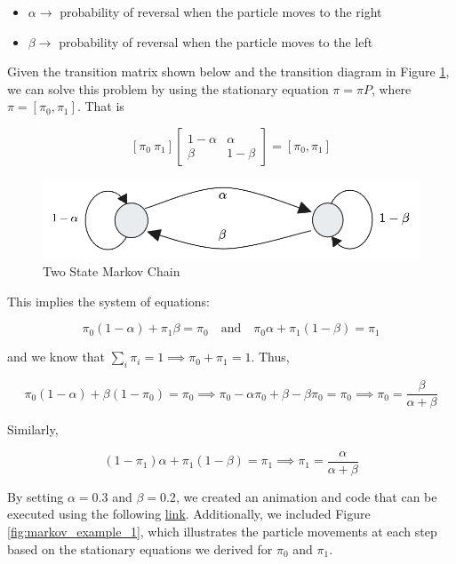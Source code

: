 \documentclass[a4paper,10pt]{article}
\begin{document}
\begin{itemize}
    \item $\alpha \rightarrow$ probability of reversal when the particle moves to the right 
    \item $\beta \rightarrow$ probability of reversal when the particle moves to the left 
\end{itemize}

Given the transition matrix shown below and the transition diagram in Figure \ref{fig:two_state_markov}, we can solve this problem by using the stationary equation $\pi = \pi P$, where $\pi = [\pi_0, \pi_1]$. That is

$$
[\pi_0 \ \pi_1] \begin{bmatrix}
1 - \alpha & \alpha \\
\beta & 1 - \beta 
\end{bmatrix} = [\pi_0, \pi_1]
$$

\begin{figure}[ht]
\centering
\includegraphics[width=0.6\linewidth]{Figures/two_state_markov.png}
\caption{Two State Markov Chain}
\label{fig:two_state_markov}
\end{figure}

This implies the system of equations:

$$
\pi_0(1 - \alpha) + \pi_1 \beta = \pi_0 \quad \text{and} \quad \pi_0 \alpha + \pi_1(1 - \beta) = \pi_1
$$

and we know that $\sum_i \pi_i = 1 \implies \pi_0 + \pi_1 = 1$. Thus,

$$
\pi_0(1 - \alpha) + \beta(1 - \pi_0) = \pi_0 \implies \pi_0 - \alpha \pi_0 + \beta - \beta \pi_0 = \pi_0 \implies \pi_0 = \frac{\beta}{\alpha + \beta}
$$

Similarly,

$$
(1 - \pi_1)\alpha + \pi_1(1 - \beta) = \pi_1 \implies \pi_1 = \frac{\alpha}{\alpha + \beta}
$$

By setting $\alpha = 0.3$ and $\beta = 0.2$, we created an animation and code that can be executed using the following \href{https://github.com/igor17400/information-theory-174/blob/main/notebooks/markov.ipynb}{link}. Additionally, we included Figure \ref{fig:markov_example_1}, which illustrates the particle movements at each step based on the stationary equations we derived for $\pi_0$ and $\pi_1$.
\end{document}
